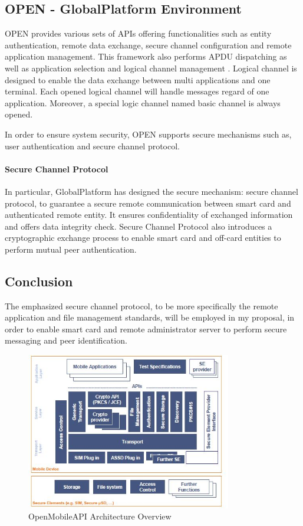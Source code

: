 \subsection{OPEN - GlobalPlatform Environment}
OPEN provides various sets of APIs offering functionalities such as entity authentication, remote data exchange, secure channel configuration and remote application management. This framework also performs APDU dispatching as well as application selection and logical channel management \cite{gp}. Logical channel is designed to enable the data exchange between multi applications and one terminal. Each opened logical channel will handle messages regard of one application. Moreover, a special logic channel named basic channel is always opened.

In order to ensure system security, OPEN supports secure mechanisms such as,  user authentication and secure channel protocol.

\paragraph{Secure Channel Protocol}
In particular, GlobalPlatform has designed the secure mechanism: secure channel protocol, to guarantee a secure remote communication between smart card and authenticated remote entity. It ensures confidentiality of exchanged information and offers data integrity check. Secure Channel Protocol also introduces  a cryptographic exchange process to enable smart card and off-card entities to perform mutual peer authentication. 


\subsection{Conclusion}
The emphasized secure channel protocol, to be more specifically the remote application and file management standards, will be employed in my proposal, in order to enable smart card and remote administrator server to perform secure messaging and peer identification.
 \begin{figure}[!htbp]
	\centering
	\includegraphics[width=0.8\textwidth]{open-architecture.jpg}
		\caption{OpenMobileAPI Architecture Overview \cite{open}}
	\label{fig:open-architecture}
\end{figure}
